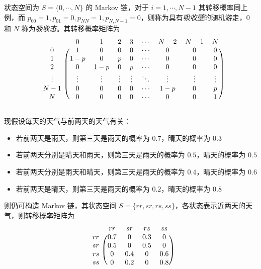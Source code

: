 \documentclass[../main.tex]{subfiles}
\begin{document}
\begin{example}
    状态空间为 $S=\{0,\cdots,N\}$ 的 Markov 链，对于 $i=1,\cdots,N-1$ 其转移概率同上例，而 $p_{00}=1,p_{01}=0,p_{NN}=1,p_{N,N-1}=0$，则称为具有\emph{吸收壁}的随机游走，$0$ 和 $N$ 称为\emph{吸收态}。其转移概率矩阵为
    \[
        \begin{blockarray}{ccccccccc}
            & 0 & 1 & 2 & 3 & \cdots & N-2 & N-1 & N \\
            \begin{block}{c(cccccccc)}
                0      & 1 & 0 & 0 & 0 & \cdots & 0 & 0 & 0 \\
                1      & 1-p & 0 & p & 0 & \cdots & 0 & 0 & 0 \\
                2      & 0 & 1-p & 0 & p & \cdots & 0 & 0 & 0 \\
                \vdots & \vdots & \vdots & \vdots & \vdots & \ddots & \vdots & \vdots & \vdots \\
                N-1    & 0 & 0 & 0 & 0 & \cdots & 1-p & 0 & p \\
                N      & 0 & 0 & 0 & 0 & \cdots & 0 & 0 & 1 \\
            \end{block}
        \end{blockarray}
    \]
\end{example}

\begin{example}
    现假设每天的天气与前两天的天气有关：
    \begin{itemize}
        \item 若前两天是雨天，则第三天是雨天的概率为 $0.7$，晴天的概率为 $0.3$
        \item 若前两天分别是晴天和雨天，则第三天是雨天的概率为 $0.5$，晴天的概率为 $0.5$
        \item 若前两天分别是雨天和晴天，则第三天是雨天的概率为 $0.4$，晴天的概率为 $0.6$
        \item 若前两天是晴天，则第三天是雨天的概率为 $0.2$，晴天的概率为 $0.8$
    \end{itemize}
    则仍可构造 Markov 链，其状态空间 $S=\{rr,sr,rs,ss\}$，各状态表示近两天的天气，则转移概率矩阵为
    \[
        \begin{blockarray}{ccccc}
            & rr & sr & rs & ss\\
            \begin{block}{c(cccc)}
                rr & 0.7 & 0 & 0.3 & 0\\
                sr & 0.5 & 0 & 0.5 & 0\\
                rs & 0 & 0.4 & 0 & 0.6\\
                ss & 0 & 0.2 & 0 & 0.8\\
            \end{block}
        \end{blockarray}
    \]
\end{example}
\end{document}
